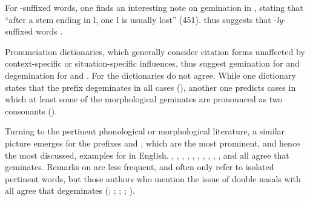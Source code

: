  For -suffixed words, one finds an interesting note on gemination in \cite{Wells.2008}, stating that ``after a stem ending in l, one l is usually lost'' (451). \cite{Wells.2008} thus suggests that \hbox{-}\textit{ly}-suffixed words .

 
 Pronunciation dictionaries, which generally consider citation forms unaffected by context-specific or situation-specific influences, thus suggest gemination for  and {degemination} for  and . For  the dictionaries do not agree. While one dictionary states that the prefix {degeminates} in all cases (\citealt{Wells.2008}), another one predicts cases in which at least some of the  morphological geminates are pronounced as two consonants (\citealt{Roach.2011}).
 
 
Turning to the pertinent phonological or morphological literature, a similar picture emerges for the prefixes  and , which are the most prominent, and hence the most discussed, examples for  in English. \citet[141]{Wijk.1966}, \citet[255]{OConnor.1973}, \citet[18]{Mohanan.1986}, \citet[119 ff.]{Borowsky.1986}, \citet[111]{Catford.1988}, \citet[106]{Kreidler.1989}, \citet[251]{Ladefoged.1993}, \citet[18]{Harris.1994}, \citet[22]{Spencer.1996}, \citet[1055 f.]{CohenGoldberg.2013}, and \citet{Cruttenden.2014} all agree that  geminates. Remarks on  are less frequent, and often only refer to isolated pertinent words, but those authors who mention the issue of double nasals with  all agree that  {degeminates} (\citealt[251]{Ladefoged.1993}; \citealt[18]{Mohanan.1986}; \citealt[18 ff.]{Harris.1994}; \citealt[248]{Cruttenden.2014}; \citealt[1055 f.]{CohenGoldberg.2013}).

